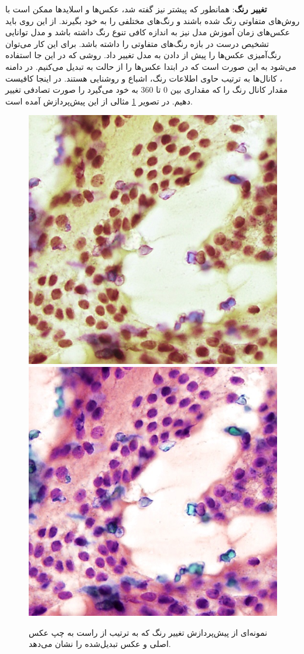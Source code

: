 \textbf{تغییر رنگ}:
همانطور که پیشتر نیز گفته شد، عکس‌ها و اسلاید‌ها ممکن است با روش‌های متفاوتی رنگ شده باشند و رنگ‌های مختلفی را به خود بگیرند.
از این روی باید عکس‌های زمان آموزش مدل نیز به اندازه کافی تنوع رنگ داشته باشد و مدل توانایی تشخیص درست در بازه رنگ‌های متفاوتی را داشته باشد.
برای این کار می‌توان رنگ‌آمیزی عکس‌ها را پیش از دادن به مدل تغییر داد.
روشی که در این جا استفاده می‌شود به این صورت است که در ابتدا عکس‌ها را از حالت  به  تبدیل می‌کنیم.
در دامنه ، کانال‌ها به ترتیب حاوی اطلاعات رنگ، اشباع و روشنایی هستند.
در اینجا کافیست مقدار کانال رنگ را که مقداری بین 0 تا 360 به خود می‌گیرد را صورت تصادفی تغییر دهیم.
در تصویر \ref{jitter augmentation} مثالی از این پیش‌پردازش آمده است.
\begin{figure}
    \begin{center}
        \includegraphics[width=0.48\linewidth]{figs/suggested_methods/subs/data_augmentation/jitter_1054-original.jpeg}
        \includegraphics[width=0.48\linewidth]{figs/suggested_methods/subs/data_augmentation/jitter_1054-transformed.jpeg}
    \end{center}
    \caption{نمونه‌ای از پیش‌پردازش تغییر رنگ که به ترتیب از راست به چپ عکس اصلی و عکس تبدیل‌شده را نشان می‌دهد.}
    \label{jitter augmentation}
\end{figure}


